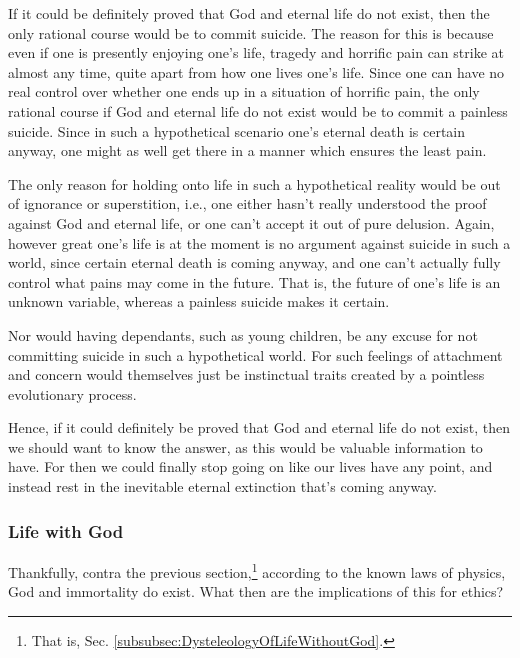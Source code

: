 \documentclass[letterpaper,12pt]{article}
\begin{document}
If it could be definitely proved that God and eternal life do not exist, then the only rational course would be to commit suicide. The reason for this is because even if one is presently enjoying one's life, tragedy and horrific pain can strike at almost any time, quite apart from how one lives one's life. Since one can have no real control over whether one ends up in a situation of horrific pain, the only rational course if God and eternal life do not exist would be to commit a painless suicide. Since in such a hypothetical scenario one's eternal death is certain anyway, one might as well get there in a manner which ensures the least pain.

The only reason for holding onto life in such a hypothetical reality would be out of ignorance or superstition, i.e., one either hasn't really understood the proof against God and eternal life, or one can't accept it out of pure delusion. Again, however great one's life is at the moment is no argument against suicide in such a world, since certain eternal death is coming anyway, and one can't actually fully control what pains may come in the future. That is, the future of one's life is an unknown variable, whereas a painless suicide makes it certain.

Nor would having dependants, such as young children, be any excuse for not committing suicide in such a hypothetical world. For such feelings of attachment and concern would themselves just be instinctual traits created by a pointless evolutionary process.

Hence, if it could definitely be proved that God and eternal life do not exist, then we should want to know the answer, as this would be valuable information to have. For then we could finally stop going on like our lives have any point, and instead rest in the inevitable eternal extinction that's coming anyway.

\subsubsection{Life with God}
\label{subsubsec:LifeWithGod}

Thankfully, contra the previous section,\footnote{That is, Sec. \ref{subsubsec:DysteleologyOfLifeWithoutGod}.} according to the known laws of physics, God and immortality do exist. What then are the implications of this for ethics?
\end{document}
